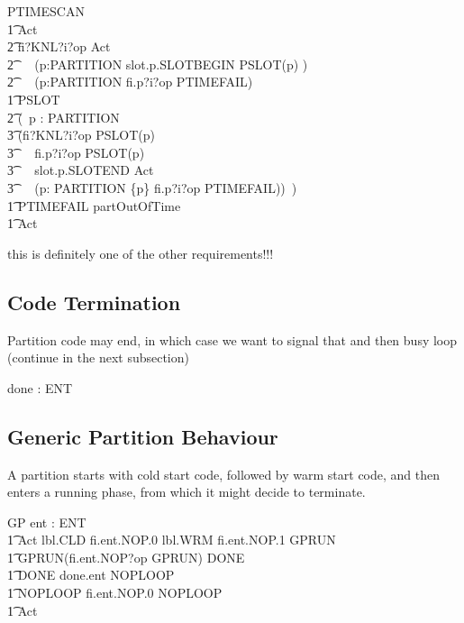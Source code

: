 \begin{circus}
\circprocess PTIMESCAN \circdef \circbegin
\\ \t1 Act \circdef
\\ \t2 fi?KNL?i?op  \then  Act
\\ \t2 ~\extchoice~  (\Extchoice  p:PARTITION
                      \circspot slot.p.SLOTBEGIN \then  PSLOT(p) )
\\ \t2 ~\extchoice~  (\Extchoice  p:PARTITION
                      \circspot fi.p?i?op \then  PTIMEFAIL)
\\ \t1 PSLOT  \circdef
\\ \t2 (~\circvar p : PARTITION \circspot
\\ \t3 (fi?KNL?i?op    \then  PSLOT(p)
\\ \t3 ~\extchoice~  fi.p?i?op      \then  PSLOT(p)
\\ \t3 ~\extchoice~  slot.p.SLOTEND \then  Act
\\ \t3 ~\extchoice~  (\Extchoice  p: PARTITION \cap \{p\}
                      \circspot fi.p?i?op \then  PTIMEFAIL))~)
\\ \t1 PTIMEFAIL \circdef partOutOfTime \then  \Stop
\\ \t1 \circspot Act
\\ \circend
\end{circus}
this is definitely one of the other requirements!!!

\subsection{Code Termination}
Partition code may end,
in which case we want to signal that and then busy loop (continue in the next subsection)
\begin{circus}
\circchannel done : ENT
\end{circus}


\subsection{Generic Partition Behaviour}

A partition starts with cold start code, followed by warm start code,
and then enters a running phase, from which it might decide to terminate.

\begin{circus}
\circprocess GP \circdef ent : ENT \circspot \circbegin
\\ \t1 Act \circdef lbl.CLD \then  fi.ent.NOP.0 \then  lbl.WRM \then  fi.ent.NOP.1 \then  GPRUN
\\ \t1 GPRUN\circdef (fi.ent.NOP?op \then  GPRUN) \intchoice DONE
\\ \t1 DONE \circdef done.ent \then  NOPLOOP
\\ \t1 NOPLOOP \circdef fi.ent.NOP.0 \then  NOPLOOP
\\ \t1 \circspot Act
\\ \circend

\end{circus}


